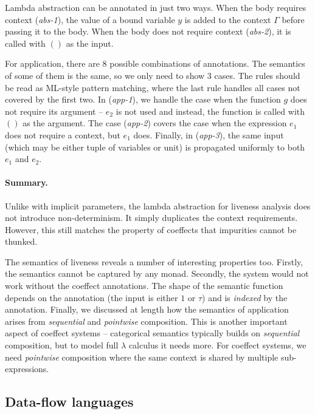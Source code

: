 Lambda abstraction can be annotated in just two ways. When the body requires context (\emph{abs-1}),
the value of a bound variable $y$ is added to the context $\Gamma$ before passing it to the body.
When the body does not require context (\emph{abs-2}), it is called with $()$ as the input.

For application, there are 8 possible combinations of annotations. The semantics of some of them
is the same, so we only need to show 3 cases. The rules should be read as ML-style pattern matching,
where the last rule handles all cases not covered by the first two. In (\emph{app-1}), we handle the
case when the function $g$ does not require its argument -- $e_2$ is not used and instead, the function
is called with $()$ as the argument. The case (\emph{app-2}) covers the case when the expression
$e_1$ does not require a context, but $e_1$ does. Finally, in (\emph{app-3}), the same input
(which may be either tuple of variables or unit) is propagated uniformly to both $e_1$ and $e_2$.

\paragraph{Summary.}
Unlike with implicit parameters, the lambda abstraction for liveness analysis does not introduce 
non-determinism. It simply duplicates the context requirements. However, this still matches the
property of coeffects that impurities cannot be thunked.

The semantics of liveness reveals a number of interesting properties too. Firstly, the semantics
cannot be captured by any monad. Secondly, the system would not work without the coeffect annotations. 
The shape of the semantic function depends on the annotation (the input is either $1$ or $\tau$) and 
is \emph{indexed} by the annotation. Finally, we discussed at length how the semantics of application
arises from \emph{sequential} and \emph{pointwise} composition. This is another important aspect of
coeffect systems -- categorical semantics typically builds on \emph{sequential} composition, but to
model full $\lambda$ calculus it needs more. For coeffect systems, we need \emph{pointwise} composition
where the same context is shared by multiple sub-expressions.


\subsection{Data-flow languages}
\label{sec:applications-flat-dataflow}

